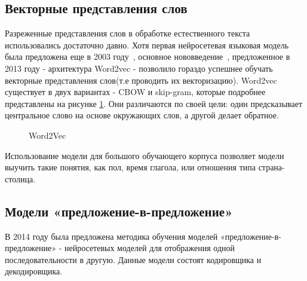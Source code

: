 \subsection{Векторные представления слов}
Разреженные представления слов в обработке естественного текста использовались достаточно давно. Хотя первая нейросетевая языковая модель была предложена еще в 2003 году~\cite{bengio_2003}, основное нововведение~\cite{mikolov_2013}, предложенное в 2013 году - архитектура Word2vec - позволило гораздо успешнее обучать векторные представления слов(т.е проводить их векторизацию). Word2vec существует в двух вариантах - CBOW и skip-gram, которые подробнее представлены на рисунке \ref{fig:Neuro2-Word2Vec}. Они различаются по своей цели: один предсказывает центральное слово на основе окружающих слов, а другой делает обратное.


\begin{figure}[ht]
 \caption{Word2Vec}\label{fig:Neuro2-Word2Vec}
\end{figure}

Использование модели для большого обучающего корпуса позволяет модели выучить такие понятия, как пол, время глагола, или отношения типа страна-столица. 

%
\subsection{Модели «предложение-в-предложение»}
В 2014 году была предложена методика обучения моделей «предложение-в-предложение» \cite{sutskever_2014} - нейросетевых моделей для отображения одной последовательности в другую. Данные модели состоят кодировщика и декодировщика. 

